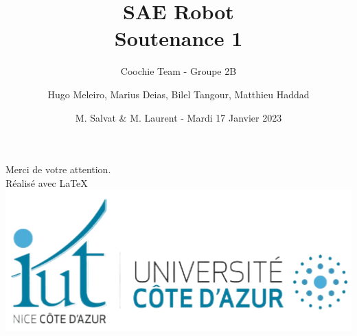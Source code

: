 \documentclass{sintefbeamer}
\title{SAE Robot \\ Soutenance 1}
\subtitle{Coochie Team - Groupe 2B}
\author{Hugo Meleiro, Marius Deias, Bilel Tangour, Matthieu Haddad}
\date{M. Salvat \& M. Laurent - Mardi 17 Janvier 2023}
\begin{document}
\maketitle








  \begin{frame}%
    \vfill
      Merci de votre attention.
      \\ Réalisé avec \LaTeX
      \\
      \includegraphics[width=0.2\linewidth]{Images/iut.png}
  \end{frame}%
\end{document}
